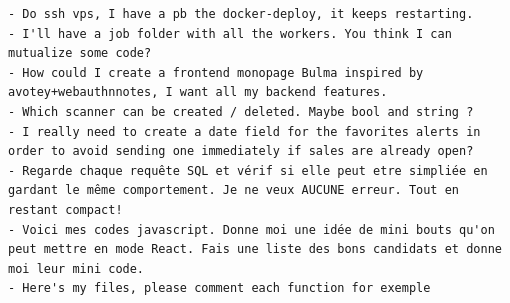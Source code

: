 \documentclass[11pt,a4paper]{article}
\begin{document}
\begin{verbatim}
- Do ssh vps, I have a pb the docker-deploy, it keeps restarting.
- I'll have a job folder with all the workers. You think I can mutualize some code?
- How could I create a frontend monopage Bulma inspired by avotey+webauthnnotes, I want all my backend features.
- Which scanner can be created / deleted. Maybe bool and string ?
- I really need to create a date field for the favorites alerts in order to avoid sending one immediately if sales are already open?
- Regarde chaque requête SQL et vérif si elle peut etre simpliée en gardant le même comportement. Je ne veux AUCUNE erreur. Tout en restant compact!
- Voici mes codes javascript. Donne moi une idée de mini bouts qu'on peut mettre en mode React. Fais une liste des bons candidats et donne moi leur mini code.
- Here's my files, please comment each function for exemple
\end{verbatim}
\end{document}
